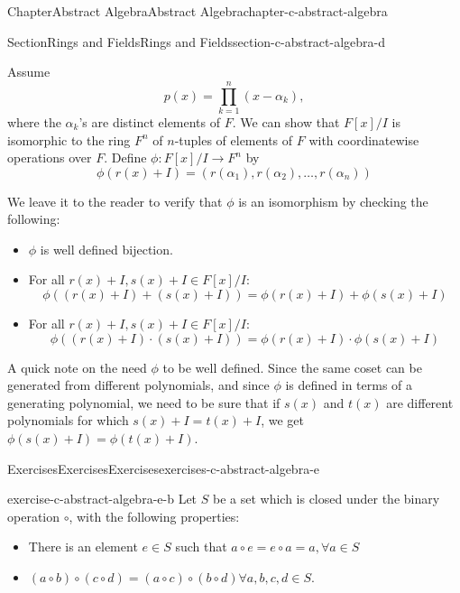 \documentclass[oneside,10pt,]{book}
\numberwithin{equation}{section}
\begin{document}
\begin{chapterptx}{Chapter}{Abstract Algebra}{}{Abstract Algebra}{}{}{chapter-c-abstract-algebra}
\begin{sectionptx}{Section}{Rings and Fields}{}{Rings and Fields}{}{}{section-c-abstract-algebra-d}
\par
Assume%
\begin{equation*}
p(x)= \prod_{k=1}^n (x-\alpha_k),
\end{equation*}
where the \(\alpha_k\)'s are distinct elements of \(F\). We can show that \(F[x]/I\) is isomorphic to the ring \(F^n\) of \(n\)-tuples of elements of \(F\) with coordinatewise operations over \(F\).  Define \(\phi:F[x]/I \rightarrow F^n\) by%
\begin{equation*}
\phi(r(x)+I)=(r(\alpha_1),r(\alpha_2),\dots,r(\alpha_n))
\end{equation*}
%
\par
We leave it to the reader to verify that \(\phi\) is an isomorphism by checking the following:%
\begin{itemize}[label=\textbullet]
\item{}\(\phi\) is well defined bijection.%
\item{}For all \(r(x)+I, s(x)+I  \in F[x]/I\):%
\begin{equation*}
\phi((r(x)+I)+(s(x)+I))= \phi(r(x)+I)+\phi(s(x)+I)
\end{equation*}
%
\item{}For all \(r(x)+I, s(x)+I  \in F[x]/I\):%
\begin{equation*}
\phi((r(x)+I)\cdot (s(x)+I))= \phi(r(x)+I)\cdot \phi(s(x)+I)
\end{equation*}
%
\end{itemize}
A quick note on the need \(\phi\) to be well defined.  Since the same coset can be generated from different polynomials, and since \(\phi\) is defined in terms of a generating polynomial, we need to be sure that if \(s(x)\) and \(t(x)\) are different polynomials for which \(s(x)+I=t(x)+I\), we get \(\phi(s(x)+I)=\phi(t(x)+I)\).%
\end{sectionptx}
%
%
\typeout{************************************************}
\typeout{************************************************}
%
\begin{exercises-section}{Exercises}{Exercises}{}{Exercises}{}{}{exercises-c-abstract-algebra-e}
\begin{divisionexercise}{1}{}{}{exercise-c-abstract-algebra-e-b}%
Let \(S\) be a set which is closed under the binary operation \(\circ\), with the following properties:%
\begin{itemize}[label=\textbullet]
\item{}There is an element \(e \in S\) such that \(a \circ e = e\circ a=a, \forall a\in S\)%
\item{}\((a \circ b) \circ (c \circ d) = (a \circ c) \circ (b \circ d) \forall a,b,c,d \in  S\).%

\end{itemize}
\end{divisionexercise}
\end{exercises-section}
\end{chapterptx}
\end{document}
